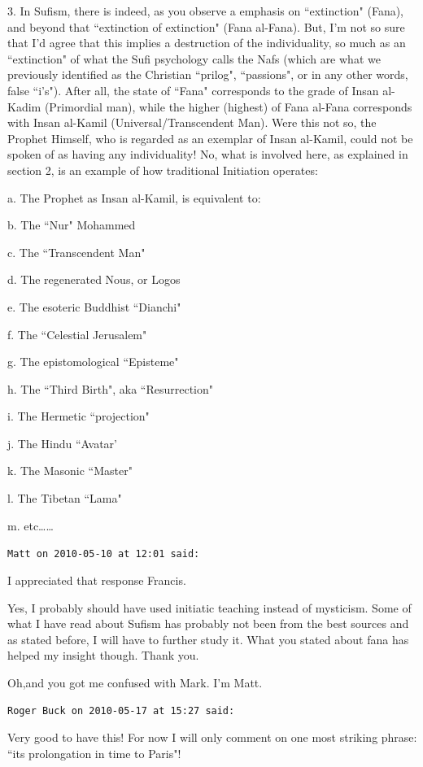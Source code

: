 \begin{footnotesize}
\begin{sffamily}
3. In Sufism, there is indeed, as you observe a emphasis on ``extinction" (Fana), and beyond that ``extinction of extinction" (Fana al-Fana). But, I'm not so sure that I'd agree that this implies a destruction of the individuality, so much as an ``extinction" of what the Sufi psychology calls the Nafs (which are what we previously identified as the Christian ``prilog", ``passions", or in any other words, false ``i's"). After all, the state of ``Fana" corresponds to the grade of Insan al-Kadim (Primordial man), while the higher (highest) of Fana al-Fana corresponds with Insan al-Kamil (Universal/Transcendent Man). Were this not so, the Prophet Himself, who is regarded as an exemplar of Insan al-Kamil, could not be spoken of as having any individuality! No, what is involved here, as explained in section 2, is an example of how traditional Initiation operates:

a. The Prophet as Insan al-Kamil, is equivalent to:

b. The ``Nur" Mohammed

c. The ``Transcendent Man"

d. The regenerated Nous, or Logos

e. The esoteric Buddhist ``Dianchi"

f. The ``Celestial Jerusalem"

g. The epistomological ``Episteme"

h. The ``Third Birth", aka ``Resurrection"

i. The Hermetic ``projection"

j. The Hindu ``Avatar'

k. The Masonic ``Master"

l. The Tibetan ``Lama"

m. etc……


\hfill

\texttt{Matt on 2010-05-10 at 12:01 said: }

I appreciated that response Francis.

Yes, I probably should have used initiatic teaching instead of mysticism. Some of what I have read about Sufism has probably not been from the best sources and as stated before, I will have to further study it. What you stated about fana has helped my insight though. Thank you.

Oh,and you got me confused with Mark. I'm Matt.


\hfill

\texttt{Roger Buck on 2010-05-17 at 15:27 said: }

Very good to have this! For now I will only comment on one most striking phrase: ``its prolongation in time to Paris"!


\end{sffamily}
\end{footnotesize}
